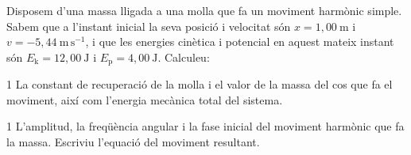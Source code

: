 Disposem d'una massa lligada a una molla que fa un moviment harmònic simple. Sabem que a l'instant inicial la seva posició i velocitat són $x = 1,00\ \mathrm{m}$ i $v = -5,44\ \mathrm{m\,s^{-1}}$, i que les energies cinètica i potencial en aquest mateix instant són $E_\mathrm{k} = 12,00\ \mathrm{J}$ i $E_\mathrm{p} = 4,00\ \mathrm{J}$. Calculeu:

\begin{apartat}{1}
La constant de recuperació de la molla i el valor de la massa del cos que fa el moviment, així com l'energia mecànica total del sistema.
\end{apartat}

\begin{apartat}{1}
L'amplitud, la freqüència angular i la fase inicial del moviment harmònic que fa la massa. Escriviu l'equació del moviment resultant.
\end{apartat}
